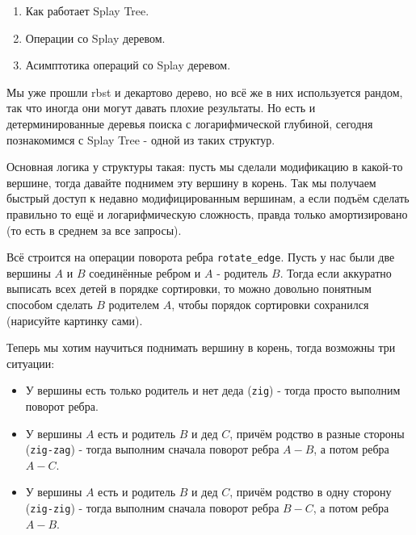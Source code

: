 \label{md2tex10}
\hyperref[md2texREADME]{\color{cyan}{К главному описанию}}


\begin{enumerate}
    \item Как работает Splay Tree.
    \item Операции со Splay деревом.
    \item Асимптотика операций со Splay деревом.
\end{enumerate}


Мы уже прошли rbst и декартово дерево, но всё же в них используется рандом, так что иногда они могут давать плохие результаты. Но есть и детерминированные деревья поиска с логарифмической глубиной, сегодня познакомимся с Splay Tree - одной из таких структур.


Основная логика у структуры такая: пусть мы сделали модификацию в какой-то вершине, тогда давайте поднимем эту вершину в корень. Так мы получаем быстрый доступ к недавно модифицированным вершинам, а если подъём сделать правильно то ещё и логарифмическую сложность, правда только амортизировано (то есть в среднем за все запросы).

Всё строится на операции поворота ребра \texttt{rotate_edge}. Пусть у нас были две вершины $A$ и $B$ соединённые ребром и $A$ - родитель $B$. Тогда если аккуратно выписать всех детей в порядке сортировки, то можно довольно понятным способом сделать $B$ родителем $A$, чтобы порядок сортировки сохранился (нарисуйте картинку сами).

Теперь мы хотим научиться поднимать вершину в корень, тогда возможны три ситуации:
\begin{itemize}
    \item У вершины есть только родитель и нет деда (\texttt{zig}) - тогда просто выполним поворот ребра.
    \item У вершины $A$ есть и родитель $B$ и дед $C$, причём родство в разные стороны (\texttt{zig-zag}) - тогда выполним сначала поворот ребра $A - B$, а потом ребра $A - C$.
    \item У вершины $A$ есть и родитель $B$ и дед $C$, причём родство в одну сторону (\texttt{zig-zig}) - тогда выполним сначала поворот ребра $B - C$, а потом ребра $A - B$.
\end{itemize}


